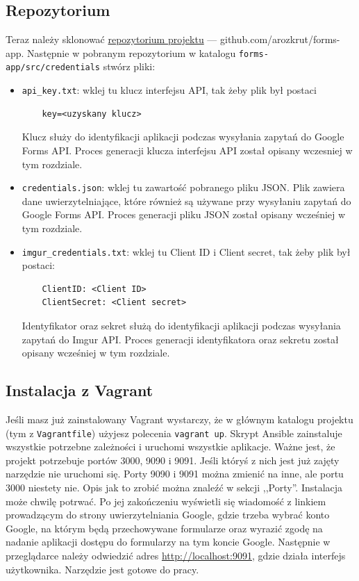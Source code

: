 \subsection{Repozytorium}
Teraz należy sklonować \href{https://github.com/arozkrut/forms-apps}
{repozytorium projektu} --- github.com/arozkrut/forms-app.
Następnie w pobranym repozytorium w katalogu \texttt{forms-app/src/credentials}
stwórz pliki:
\begin{itemize}
  \item \texttt{api\_key.txt}: wklej tu klucz interfejsu API, tak żeby plik był
  postaci
  \begin{verbatim}
    key=<uzyskany klucz>
  \end{verbatim}
  Klucz służy do identyfikacji aplikacji podczas wysyłania zapytań do Google Forms API. 
  Proces generacji klucza interfejsu API został opisany wczesniej w tym rozdziale.
  \item \texttt{credentials.json}: wklej tu zawartość pobranego pliku JSON.
  Plik zawiera dane uwierzytelniające, które również są używane przy wysyłaniu
  zapytań do Google Forms API. 
  Proces generacji pliku JSON został opisany wcześniej w tym rozdziale.
  \item \texttt{imgur\_credentials.txt}: wklej tu Client ID i Client secret,
  tak żeby plik był postaci:
  \begin{verbatim}
    ClientID: <Client ID>
    ClientSecret: <Client secret>
  \end{verbatim}
  Identyfikator oraz sekret służą do identyfikacji aplikacji podczas wysyłania zapytań
  do Imgur API. Proces generacji identyfikatora oraz sekretu został opisany wcześniej
  w tym rozdziale.
\end{itemize}

\subsection{Instalacja z Vagrant}
Jeśli masz już zainstalowany Vagrant wystarczy, że w głównym katalogu projektu
(tym z \texttt{Vagrantfile}) użyjesz polecenia \texttt{vagrant up}. Skrypt
Ansible zainstaluje wszystkie potrzebne zależności i uruchomi wszystkie
aplikacje. Ważne jest, że projekt potrzebuje portów 3000, 9090 i 9091.
Jeśli któryś z nich jest już zajęty narzędzie nie uruchomi się. Porty 9090 i 9091
można zmienić na inne, ale portu 3000 niestety nie. Opis jak to zrobić można znaleźć
w sekcji ,,Porty''. Instalacja może
chwilę potrwać. Po jej zakończeniu wyświetli się wiadomość z linkiem prowadzącym
do strony uwierzytelniania Google, gdzie trzeba wybrać konto Google, na którym
będą przechowywane formularze oraz wyrazić zgodę na nadanie aplikacji dostępu do
formularzy na tym koncie Google. Następnie w przeglądarce należy odwiedzić adres
\href{http://localhost:9091}{http://localhost:9091}, gdzie działa interfejs
użytkownika. Narzędzie jest gotowe do pracy.

